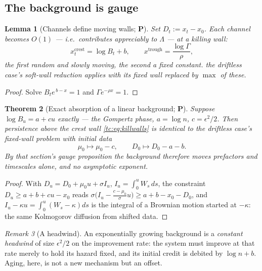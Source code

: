 \documentclass[11pt]{article}
\numberwithin{equation}{section}
\theoremstyle{plain}
\newtheorem{theorem}{Theorem}[section]
\newtheorem{lemma}[theorem]{Lemma}
\theoremstyle{definition}
\theoremstyle{remark}
\newtheorem{remark}[theorem]{Remark}
\begin{document}
\subsection{The background is gauge}\label{tc:subsub:gauge}

\begin{lemma}[Channels define moving walls; \textbf{P}]
\label{tc:lem:walls}
Set $D_t:=x_t-x_0$. Each channel becomes $O(1)$ --- i.e.\ contributes
appreciably to $\Lambda$ --- at a \emph{killing wall}:
\begin{equation}\label{tc:eq:killwalls}
x^{\mathrm{crest}}_t=\log B_t+b,
\qquad
x^{\mathrm{trough}}=\frac{\log\Gamma}{\rho},
\end{equation}
the first random and slowly moving, the second a fixed constant. the driftless case's soft-wall reduction applies with its fixed wall replaced by
$\max$ of these.
\end{lemma}

\begin{proof}
Solve $B_te^{\,b-x}=1$ and $\Gamma e^{-\rho x}=1$.
\end{proof}

\begin{theorem}[Exact absorption of a linear background; \textbf{P}]
\label{tc:thm:absorb}
Suppose $\log B_u=a+cu$ exactly --- the Gompertz phase, $a=\log n$,
$c=\epsilon^{2}/2$. Then persistence above the crest wall
\eqref{tc:eq:killwalls} is \emph{identical} to the driftless case's fixed-wall
problem with initial data
\begin{equation}\label{tc:eq:shift}
\mu_0\longmapsto\mu_0-c,\qquad D_0\longmapsto D_0-a-b .
\end{equation}
By that section's gauge proposition the background therefore moves
prefactors and timescales alone, and no asymptotic exponent.
\end{theorem}

\begin{proof}
With $D_u=D_0+\mu_0u+\sigma I_u$, $I_u=\int_0^u W_s\,ds$, the constraint
$D_u\ge a+b+cu-x_0$ reads
$\sigma\bigl(I_u-\tfrac{c-\mu_0}{\sigma}u\bigr)\ge a+b-x_0-D_0$, and
$I_u-\kappa u=\int_0^u(W_s-\kappa)ds$ is the integral of a Brownian
motion started at $-\kappa$: the same Kolmogorov diffusion from shifted
data.
\end{proof}

\begin{remark}[A headwind]\label{tc:rem:headwind}
An exponentially growing background is a \emph{constant headwind} of
size $\epsilon^{2}/2$ on the improvement rate: the system must improve
at that rate merely to hold its hazard fixed, and its initial credit is
debited by $\log n+b$. Aging, here, is not a new mechanism but an
offset.
\end{remark}
\end{document}
